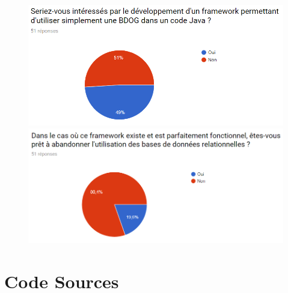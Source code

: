 \documentclass[a4paper,fleqn,12pt,oneside]{report}
\begin{document}
\begin{figure}[htp]
\centering
    \includegraphics[width=.45\textwidth]{figures/11.png}\quad
    \includegraphics[width=.45\textwidth]{figures/12.png}
\end{figure}


\chapter*{Code Sources}

%

 
\end{document}

